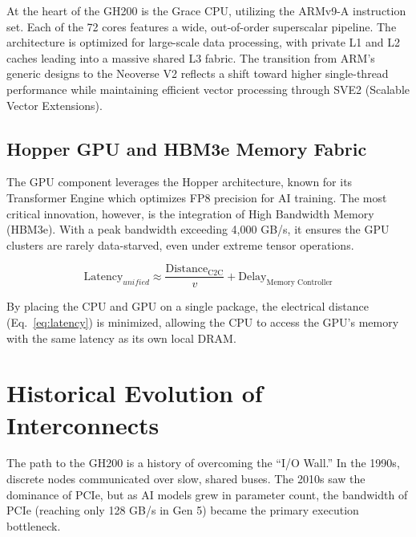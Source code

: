 \documentclass[12pt, a4paper]{article}
\begin{document}
At the heart of the GH200 is the Grace CPU, utilizing the ARMv9-A instruction set. Each of the 72 cores features a wide, out-of-order superscalar pipeline. The architecture is optimized for large-scale data processing, with private L1 and L2 caches leading into a massive shared L3 fabric. The transition from ARM's generic designs to the Neoverse V2 reflects a shift toward higher single-thread performance while maintaining efficient vector processing through SVE2 (Scalable Vector Extensions).

\subsection{Hopper GPU and HBM3e Memory Fabric}

The GPU component leverages the Hopper architecture, known for its Transformer Engine which optimizes FP8 precision for AI training. The most critical innovation, however, is the integration of High Bandwidth Memory (HBM3e). With a peak bandwidth exceeding 4,000 GB/s, it ensures the GPU clusters are rarely data-starved, even under extreme tensor operations.

\begin{equation}
  \text{Latency}_{unified} \approx \frac{\text{Distance}_{\text{C2C}}}{v} + \text{Delay}_{\text{Memory Controller}}
  \label{eq:latency}
\end{equation}

\noindent By placing the CPU and GPU on a single package, the electrical distance (Eq.~\ref{eq:latency}) is minimized, allowing the CPU to access the GPU's memory with the same latency as its own local DRAM.

\section{Historical Evolution of Interconnects}
\label{sec:history}

The path to the GH200 is a history of overcoming the ``I/O Wall.'' In the 1990s, discrete nodes communicated over slow, shared buses. The 2010s saw the dominance of PCIe, but as AI models grew in parameter count, the bandwidth of PCIe (reaching only 128 GB/s in Gen 5) became the primary execution bottleneck.
\end{document}
